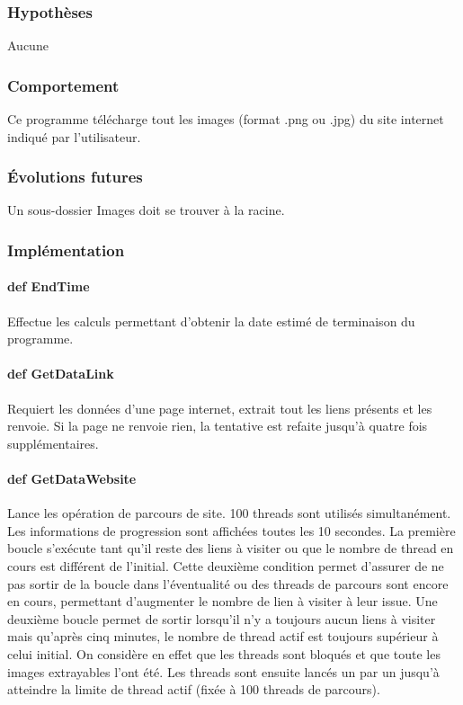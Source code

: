 \documentclass[a4paper,12pt]{article}
\begin{document}
\subsubsection{Hypothèses}
Aucune
\subsubsection{Comportement}
Ce programme télécharge tout les images (format .png ou .jpg) du site internet indiqué par l'utilisateur.
\subsubsection{Évolutions futures}
Un sous-dossier Images doit se trouver à la racine.
\subsubsection{Implémentation}
\paragraph{def EndTime}
Effectue les calculs permettant d'obtenir la date estimé de terminaison du programme. 
\paragraph{def GetDataLink}
Requiert les données d'une page internet, extrait tout les liens présents et les renvoie. Si la page ne renvoie rien, la tentative est refaite jusqu'à quatre fois supplémentaires.

\paragraph{def GetDataWebsite}
Lance les opération de parcours de site. 100 threads sont utilisés simultanément. Les informations de progression sont affichées toutes les 10 secondes.
La première boucle s'exécute tant qu'il reste des liens à visiter ou que le nombre de thread en cours est différent de l'initial. Cette deuxième condition permet d'assurer de ne pas sortir de la boucle dans l'éventualité ou des threads de parcours sont encore en cours, permettant d'augmenter le nombre de lien à visiter à leur issue.
Une deuxième boucle permet de sortir lorsqu'il n'y a toujours aucun liens à visiter mais qu'après cinq minutes, le nombre de thread actif est toujours supérieur à celui initial. On considère en effet que les threads sont bloqués et que toute les images extrayables l'ont été.
Les threads sont ensuite lancés un par un jusqu'à atteindre la limite de thread actif (fixée à 100 threads de parcours).
\end{document}
